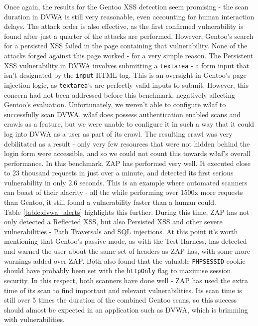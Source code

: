 Once again, the results for the Gentoo XSS detection seem promising - the scan duration in DVWA is still very reasonable, even accounting for human interaction delays. The attack order is also effective, as the first confirmed vulnerability is found after just a quarter of the attacks are performed. However, Gentoo's search for a persisted XSS failed in the page containing that vulnerability. None of the attacks forged against this page worked - for a very simple reason. The Persistent XSS vulnerability in DVWA involves submitting a \texttt{textarea} - a form input that isn't designated by the \texttt{input} HTML tag. This is an oversight in Gentoo's page injection logic, as \texttt{textarea}'s are perfectly valid inputs to submit. However, this concern had not been addressed before this benchmark, negatively affecting Gentoo's evaluation. Unfortunately, we weren't able to configure w3af to successfully scan DVWA. w3af does possess authentication enabled scans and crawls as a feature, but we were unable to configure it in such a way that it could log into DVWA as a user as part of its crawl. The resulting crawl was very debilitated as a result - only very few resources that were not hidden behind the login form were accessible, and so we could not count this towards w3af's overall performance. In this benchmark, ZAP has performed very well. It executed close to 23 thousand requests in just over a minute, and detected its first serious vulnerability in only 2.6 seconds. This is an example where automated scanners can boast of their alacrity - all the while performing over 1500x more requests than Gentoo, it still found a vulnerability faster than a human could. \\

Table \ref{table:dvwa_alerts} highlights this further. During this time, ZAP has not only detected a Reflected XSS, but also Persisted XSS and other severe vulnerabilities - Path Traversals and SQL injections. At this point it's worth mentioning that Gentoo's passive mode, as with the Test Harness, has detected and warned the user about the same set of headers as ZAP has, with some more warnings added over ZAP. Both also found that the valuable \texttt{PHPSESSID} cookie should have probably been set with the \texttt{httpOnly} flag to maximise session security. In this respect, both scanners have done well - ZAP has used the extra time of its scan to find important and relevant vulnerabilities. Its scan time is still over 5 times the duration of the combined Gentoo scans, so this success should almost be expected in an application such as DVWA, which is brimming with vulnerabilities.



